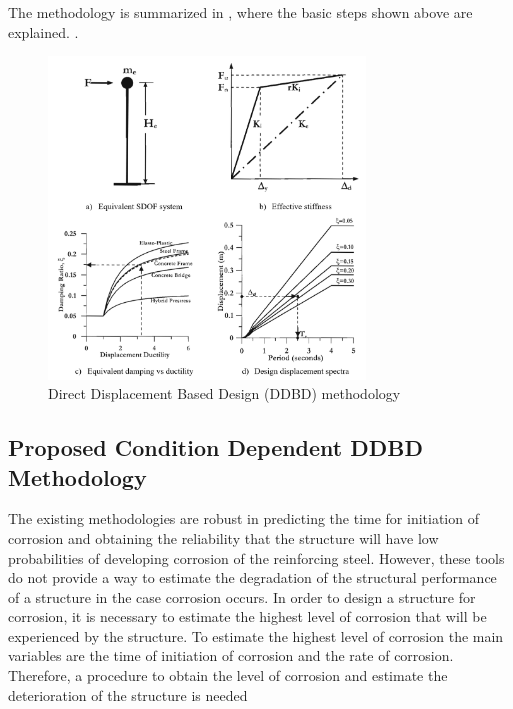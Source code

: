 The methodology is summarized in , where the basic steps shown above are explained.
.
\begin{figure}[htbp]
	\centering
	\includegraphics[width=0.75\textwidth]{VAC Thesis 2.0/Chapter-6/figs/DDBD.png}
	\caption{Direct Displacement Based Design (DDBD) methodology}
	\label{fig:DDBD_CH6}
\end{figure}
\subsection{Proposed Condition Dependent DDBD Methodology}

The existing methodologies are robust in predicting the time for initiation of corrosion and obtaining the reliability that the structure will have low probabilities of developing corrosion of the reinforcing steel. However, these tools do not provide a way to estimate the degradation of the structural performance of a structure in the case corrosion occurs. In order to design a structure for corrosion, it is necessary to estimate the highest level of corrosion that will be experienced by the structure. To estimate the highest level of corrosion the main variables are the time of initiation of corrosion and the rate of corrosion. Therefore, a procedure to obtain the level of corrosion and estimate the deterioration of the structure is needed

